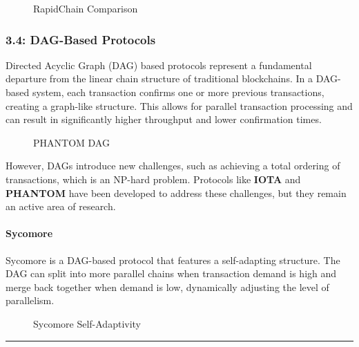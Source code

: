\begin{figure}
\centering
\caption{RapidChain Comparison}
\end{figure}

\subsubsection{3.4: DAG-Based Protocols}\label{dag-based-protocols}

Directed Acyclic Graph (DAG) based protocols represent a fundamental
departure from the linear chain structure of traditional blockchains. In
a DAG-based system, each transaction confirms one or more previous
transactions, creating a graph-like structure. This allows for parallel
transaction processing and can result in significantly higher throughput
and lower confirmation times.

\begin{figure}
\centering
\caption{PHANTOM DAG}
\end{figure}

However, DAGs introduce new challenges, such as achieving a total
ordering of transactions, which is an NP-hard problem. Protocols like
\textbf{IOTA} and \textbf{PHANTOM} have been developed to address these
challenges, but they remain an active area of research.

\paragraph{Sycomore}\label{sycomore}

Sycomore is a DAG-based protocol that features a self-adapting
structure. The DAG can split into more parallel chains when transaction
demand is high and merge back together when demand is low, dynamically
adjusting the level of parallelism.

\begin{figure}
\centering
\caption{Sycomore Self-Adaptivity}
\end{figure}

\begin{center}\rule{0.5\linewidth}{0.5pt}\end{center}


